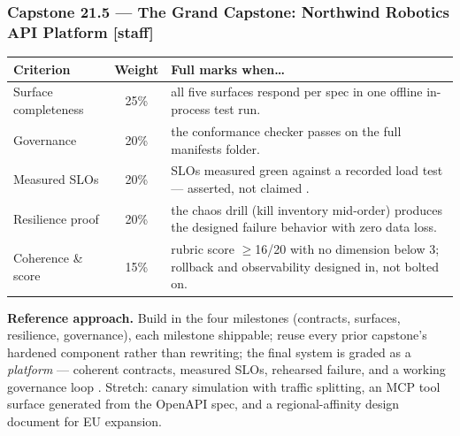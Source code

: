 \subsubsection*{Capstone 21.5 --- The Grand Capstone: Northwind Robotics API Platform [staff]}
\begin{center}\small
\begin{tabularx}{\textwidth}{l c X}
\toprule
\textbf{Criterion} & \textbf{Weight} & \textbf{Full marks when\ldots} \\
\midrule
Surface completeness & 25\% & all five surfaces respond per spec in one offline in-process test run. \\
Governance & 20\% & the conformance checker passes on the full manifests folder. \\
Measured SLOs & 20\% & SLOs measured green against a recorded load test --- asserted, not claimed \cite{beyer2016sre}. \\
Resilience proof & 20\% & the chaos drill (kill inventory mid-order) produces the designed failure behavior with zero data loss. \\
Coherence \& score & 15\% & rubric score $\ge$16/20 with no dimension below 3; rollback and observability designed in, not bolted on. \\
\bottomrule
\end{tabularx}
\end{center}
\textbf{Reference approach.} Build in the four milestones (contracts,
surfaces, resilience, governance), each milestone shippable; reuse every
prior capstone's hardened component rather than rewriting; the final system
is graded as a \emph{platform} --- coherent contracts, measured SLOs,
rehearsed failure, and a working governance loop
\cite{newman2021microservices, kleppmann2017ddia}. Stretch: canary
simulation with traffic splitting, an MCP tool surface generated from the
OpenAPI spec, and a regional-affinity design document for EU expansion.

